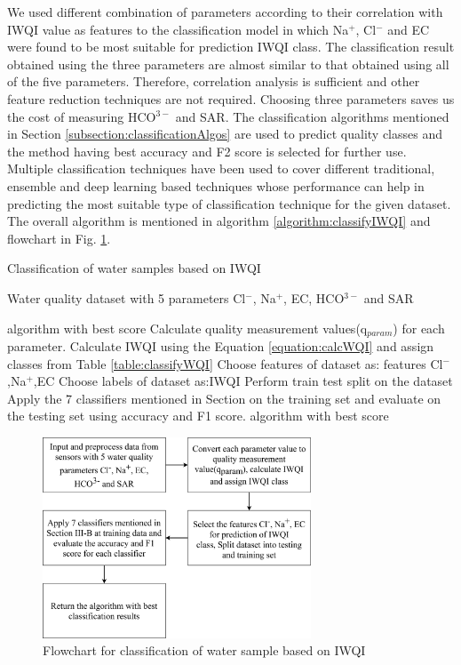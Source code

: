 \documentclass[conference]{IEEEtran}
\begin{document}
We used different combination of parameters according to their correlation with IWQI value as features to the classification model in which Na$^+$, Cl$^-$ and EC were found to be most suitable for prediction IWQI class. The classification result obtained using the three parameters are almost similar to that obtained using all of the five parameters. Therefore, correlation analysis is sufficient and other feature reduction techniques are not required. Choosing three parameters saves us the cost of measuring HCO$^{3-}$ and SAR. The classification algorithms mentioned in Section \ref{subsection:classificationAlgos}  are used to predict quality classes and the method having best accuracy and F2 score is selected for further use. Multiple classification techniques have been used to cover different traditional, ensemble and deep learning based techniques whose performance can help in predicting the most suitable type of classification technique for the given dataset. The overall algorithm is mentioned in algorithm \ref{algorithm:classifyIWQI} and flowchart in Fig. \ref{fig:classificationFlowchart}.


\begin{algorithm}
	\caption{Classification of water samples based on IWQI}
	\begin{algorithmic}[1]
	    \label{algorithm:classifyIWQI}
		\renewcommand{\algorithmicrequire}{\textbf{Input:}}
		\renewcommand{\algorithmicensure}{\textbf{Output:}}
		\REQUIRE Water quality dataset with 5 parameters Cl$^-$, Na$^+$, EC, HCO$^{3-}$ and SAR
		
		\ENSURE  algorithm with best score       
        \STATE Calculate quality measurement values(q$_{param}$) for each parameter.
        \STATE Calculate IWQI using the Equation \ref{equation:calcWQI} and assign classes from Table \ref{table:classifyWQI}
        \STATE Choose features of dataset as: features \xleftarrow{} Cl$^-$,Na$^+$,EC 
        \STATE Choose labels of dataset as:IWQI
        \STATE Perform train test split on the dataset
        \STATE Apply the 7 classifiers mentioned in Section \text{\ref{subsection:classificationAlgos}} on the training set and evaluate on the testing set using accuracy and F1 score.
        \RETURN algorithm with best score
	\end{algorithmic} 
\end{algorithm}

\begin{figure}[h!]
\centering
\includegraphics[width=8cm]{IWQI_prediction.png}
\caption{Flowchart for classification of water sample based on IWQI}
\label{fig:classificationFlowchart}
\end{figure}
\end{document}
